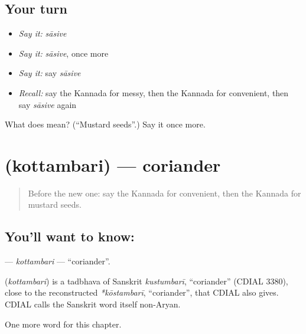 \subsection*{Your turn}
\begin{itemize}
\raggedright
  \item \emph{Say it:} \emph{sāsive}
  \item \emph{Say it:} \emph{sāsive}, once more
  \item \emph{Say it:} say \emph{sāsive}
  \item \emph{Recall:} say the Kannada for messy, then the Kannada for convenient, then say \emph{sāsive} again
\end{itemize}

\begin{tcolorbox}[breakable,colback=teal!4,colframe=teal!35!black,title={Before you move on}]
What does  mean? (\textquotedblleft{}Mustard seeds\textquotedblright{}.) Say it once more.
\end{tcolorbox}
\section[\texorpdfstring{\kn{ಕೊತ್ತಂಬರಿ} (kottambari)}{ಕೊತ್ತಂಬರಿ (kottambari)}]{ (kottambari) — coriander}

\label{lesson:KA-C293-kottambari}



\begin{quote}
Before the new one: say the Kannada for convenient, then the Kannada for mustard seeds.
\end{quote}

\subsection*{You'll want to know: }
\textbf{} — \emph{kottambari} — \textquotedblleft{}coriander\textquotedblright{}.

\begin{cousinweb}
\textbf{} (\emph{kottambari}) is a tadbhava of Sanskrit \emph{kustumbarī}, \textquotedblleft{}coriander\textquotedblright{} (CDIAL 3380), close to the reconstructed \emph{*kōstambarī}, \textquotedblleft{}coriander\textquotedblright{}, that CDIAL also gives. CDIAL calls the Sanskrit word itself non-Aryan.
\end{cousinweb}

\begin{grammarlens}[title={What you've built}]
One more word for this chapter.
\end{grammarlens}

